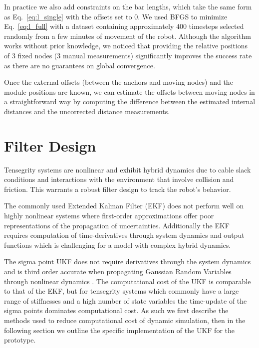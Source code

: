 {In practice we also add constraints on the bar lengths, which take the same form as Eq.~\ref{eq:l_single} with the offsets set to $0$.
We used BFGS to minimize Eq.~\ref{eq:l_full} with  a dataset containing approximately $400$ timesteps selected randomly from a few minutes of movement of the robot.
Although the algorithm works without prior knowledge, we noticed that providing the relative positions of $3$ fixed nodes ($3$ manual measurements) significantly improves the success rate as there are no guarantees on global convergence.

Once the external offsets (between the anchors and moving nodes) and the module positions are known, we can estimate the offsets between moving nodes in a straightforward way by computing the difference between the estimated internal distances and the uncorrected distance measurements.




\section{Filter Design}
\label{txt:ukf}

Tensegrity systems are nonlinear and exhibit hybrid dynamics due to cable slack conditions and  interactions with the environment that involve collision and friction. This warrants a robust filter design to track the robot's behavior.

The commonly used Extended Kalman Filter (EKF) does not perform well on highly nonlinear systems where first-order approximations offer poor representations of the propagation of uncertainties.
Additionally the EKF requires computation of time-derivatives through system dynamics and output functions which is challenging for a model with complex hybrid dynamics. 

The sigma point UKF does not require derivatives through the system dynamics and is third order accurate when propagating Gaussian Random Variables through nonlinear dynamics \cite{wan2000unscented}. The computational cost of the UKF is comparable to that of the EKF, but for tensegrity systems which commonly have a large range of stiffnesses and a high number of state variables the time-update of the sigma points dominates computational cost. As such we first describe the methods used to reduce computational cost of dynamic simulation, then in the following section we outline the specific implementation of the UKF for the \SB{} prototype.

}

